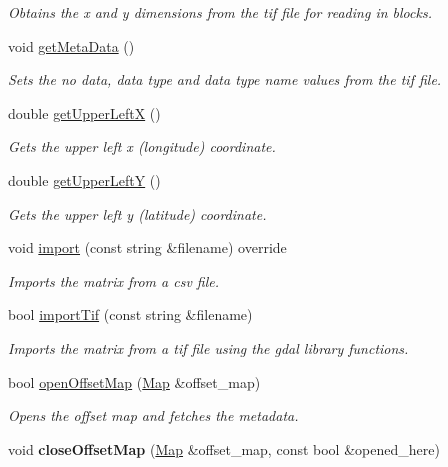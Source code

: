 \begin{DoxyCompactItemize}
\begin{DoxyCompactList}\small\item\em Obtains the x and y dimensions from the tif file for reading in blocks. \end{DoxyCompactList}\item 
void \hyperlink{class_map_a180284cfba3442eb3d62fc41d0d8f546}{get\+Meta\+Data} ()\hypertarget{class_map_a180284cfba3442eb3d62fc41d0d8f546}{}\label{class_map_a180284cfba3442eb3d62fc41d0d8f546}

\begin{DoxyCompactList}\small\item\em Sets the no data, data type and data type name values from the tif file. \end{DoxyCompactList}\item 
double \hyperlink{class_map_afd32790ea28d0c5aa99b582b2d474933}{get\+Upper\+LeftX} ()
\begin{DoxyCompactList}\small\item\em Gets the upper left x (longitude) coordinate. \end{DoxyCompactList}\item 
double \hyperlink{class_map_a2d7b63836d06b2710192e7c8afd38641}{get\+Upper\+LeftY} ()
\begin{DoxyCompactList}\small\item\em Gets the upper left y (latitude) coordinate. \end{DoxyCompactList}\item 
void \hyperlink{class_map_ad1a25204dce37addc3453e091552b014}{import} (const string \&filename) override
\begin{DoxyCompactList}\small\item\em Imports the matrix from a csv file. \end{DoxyCompactList}\item 
bool \hyperlink{class_map_a2306683b0b3b4ddb7d776d1ff60d4491}{import\+Tif} (const string \&filename)
\begin{DoxyCompactList}\small\item\em Imports the matrix from a tif file using the gdal library functions. \end{DoxyCompactList}\item 
bool \hyperlink{class_map_ade20cc1876ba2774f0f8274d432d89c3}{open\+Offset\+Map} (\hyperlink{class_map}{Map} \&offset\+\_\+map)
\begin{DoxyCompactList}\small\item\em Opens the offset map and fetches the metadata. \end{DoxyCompactList}\item 
void {\bfseries close\+Offset\+Map} (\hyperlink{class_map}{Map} \&offset\+\_\+map, const bool \&opened\+\_\+here)\hypertarget{class_map_a39d76e341e0f817d65ddf0100cfe5f26}{}\label{class_map_a39d76e341e0f817d65ddf0100cfe5f26}


\end{DoxyCompactItemize}
